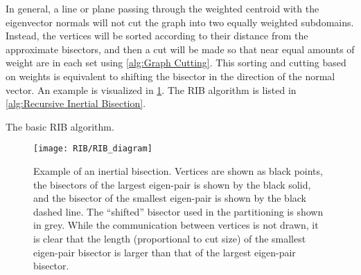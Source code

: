{{{{        In general, a line or plane passing through the weighted centroid with the eigenvector normals will not cut the graph into two equally weighted subdomains.
        Instead, the vertices will be sorted according to their distance from the approximate bisectors, and then a cut will be made so that near equal amounts of weight are in each set using \cref{alg:Graph Cutting}.
        This sorting and cutting based on weights is equivalent to shifting the bisector in the direction of the normal vector.
        An example is visualized in \cref{fig:Spatial Decomposition:RIB Diagram}.
        The RIB algorithm is listed in \cref{alg:Recursive Inertial Bisection}.

        \begin{algorithm}
          \centering
          \caption{The basic \acf{RIB} algorithm.}
          \label{alg:Recursive Inertial Bisection}
          \begin{algorithmic}[1]
               
            \EndProcedure
          \end{algorithmic}
        \end{algorithm}

        \begin{figure}
          \centering
          \texttt{[image: RIB/RIB\_diagram]}
          \caption{
            Example of an inertial bisection.
            Vertices are shown as black points, the bisectors of the largest eigen-pair is shown by the black solid, and the bisector of the smallest eigen-pair is shown by the black dashed line.
            The ``shifted'' bisector used in the partitioning is shown in grey.
            While the communication between vertices is not drawn, it is clear that the length (proportional to cut size) of the smallest eigen-pair bisector is larger than that of the largest eigen-pair bisector.
            \label{fig:Spatial Decomposition:RIB Diagram}
          }
        \end{figure}
      }
}}}
